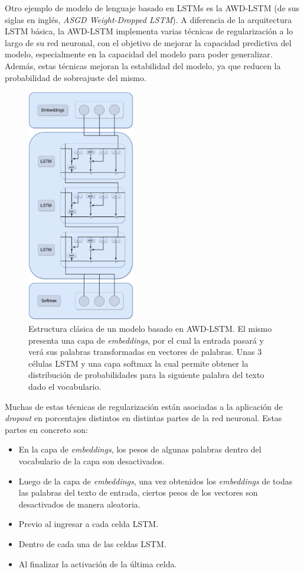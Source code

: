 Otro ejemplo de modelo de lenguaje basado en LSTMs es la AWD-LSTM (de sus siglas en inglés, \textit{ASGD Weight-Dropped LSTM}). A diferencia de la arquitectura LSTM básica, la AWD-LSTM implementa varias técnicas de regularización a lo largo de su red neuronal, con el objetivo de mejorar la capacidad predictiva del modelo, especialmente en la capacidad del modelo para poder generalizar. Además, estas técnicas mejoran la estabilidad del modelo, ya que reducen la probabilidad de sobreajuste del mismo.

\begin{figure}[H]
    \centering
    \includegraphics[width=0.42\textwidth]{imagenes/AWD-LSTM.drawio.png}
    \caption{Estructura clásica de un modelo basado en AWD-LSTM. El mismo presenta una capa de \textit{embeddings}, por el cual la entrada pasará y verá sus palabras transformadas en vectores de palabras. Unas 3 células LSTM y una capa softmax la cual permite obtener la distribución de probabilidades para la siguiente palabra del texto dado el vocabulario.}
    \label{fig:awd-lstm}
\end{figure}

Muchas de estas técnicas de regularización están asociadas a la aplicación de \textit{dropout} en porcentajes distintos en distintas partes de la red neuronal. Estas partes en concreto son:

\begin{itemize}
    \item En la capa de \textit{embeddings}, los pesos de algunas palabras dentro del vocabulario de la capa son desactivados.
    \item Luego de la capa de \textit{embeddings}, una vez obtenidos los \textit{embeddings} de todas las palabras del texto de entrada, ciertos pesos de los vectores son desactivados de manera aleatoria.
    \item Previo al ingresar a cada celda LSTM.
    \item Dentro de cada una de las celdas LSTM.
    \item Al finalizar la activación de la última celda.
\end{itemize}

